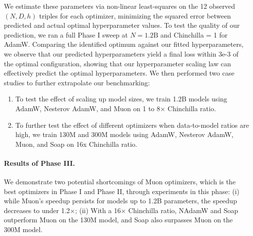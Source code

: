 We estimate these parameters via non-linear least-squares on the 12 observed $(N,D,h)$ triples for each optimizer, minimizing the squared error between predicted and actual optimal hyperparameter values. To test the quality of our prediction, we ran a full Phase I sweep at $N=1.2\mathrm{B}$ and Chinchilla = 1 for AdamW. 
Comparing the identified optimum against our fitted hyperparameters, we observe that our predicted hyperparameters yield a final loss within 3e-3 of the optimal configuration, showing that our hyperparameter scaling law can effectively predict the optimal hyperparameters. 
We then performed two case studies to further extrapolate our benchmarking:
\begin{enumerate}[leftmargin=*]
    \item To test the effect of scaling up model sizes, we train 1.2B models using AdamW, Nesterov AdamW, and Muon on 1 to 8× Chinchilla ratio. 
    \item To further test the effect of different optimizers when data-to-model ratios are high, we train 130M and 300M models using AdamW, Nesterov AdamW, Muon, and Soap on 16x Chinchilla ratio.
\end{enumerate}


\paragraph{Results of Phase III.} We demonstrate two potential shortcomings of Muon optimizers, which is the best optimizers in Phase I and Phase II, through experiments in this phase: (i) while Muon's speedup persists for models up to 1.2B parameters, the speedup decreases to under 1.2×; (ii) With a 16× Chinchilla ratio, NAdamW and Soap outperform Muon on the 130M model, and Soap also surpasses Muon on the 300M model.
